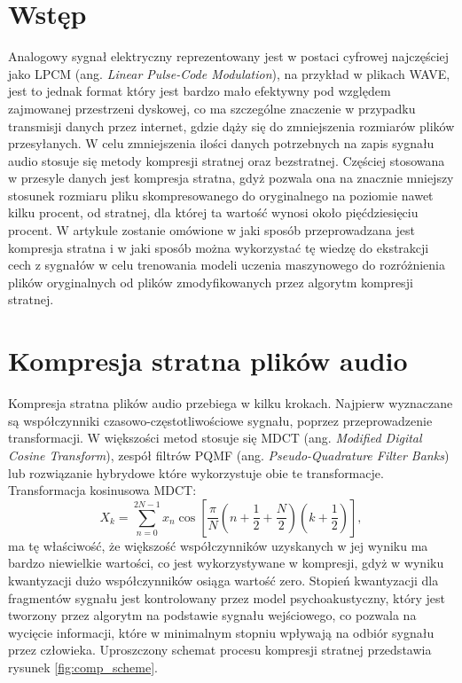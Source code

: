 \documentclass[12pt]{oska}
\affiliation{Akademia Górniczo-Hutnicza w Krakowie}
\let\Oldsection\section
\renewcommand{\section}{\FloatBarrier\Oldsection}
\begin{document}
\maketitles

\section{Wstęp}

Analogowy sygnał elektryczny reprezentowany jest w postaci cyfrowej najczęściej
jako LPCM (ang. \textit{Linear Pulse-Code Modulation}), na przykład w plikach
WAVE, jest to jednak format który jest bardzo mało efektywny pod względem
zajmowanej przestrzeni dyskowej, co ma szczególne znaczenie w przypadku
transmisji danych przez internet, gdzie dąży się do zmniejszenia rozmiarów
plików przesyłanych. W celu zmniejszenia ilości danych potrzebnych na zapis
sygnału audio stosuje się metody kompresji stratnej oraz bezstratnej. Częściej
stosowana w przesyle danych jest kompresja stratna, gdyż pozwala ona na
znacznie mniejszy stosunek rozmiaru pliku skompresowanego do oryginalnego na
poziomie nawet kilku procent, od stratnej, dla której ta wartość wynosi około
pięćdziesięciu procent. W artykule zostanie omówione w jaki sposób
przeprowadzana jest kompresja stratna i w jaki sposób można wykorzystać tę
wiedzę do ekstrakcji cech z sygnałów w celu trenowania modeli uczenia
maszynowego do rozróżnienia plików oryginalnych od plików zmodyfikowanych przez
algorytm kompresji stratnej.

\section{Kompresja stratna plików audio}

Kompresja stratna plików audio przebiega w kilku krokach. Najpierw wyznaczane
są współczynniki czasowo-częstotliwościowe sygnału, poprzez przeprowadzenie
transformacji. W większości metod stosuje się MDCT (ang. \textit{Modified
Digital Cosine Transform}), zespół filtrów PQMF (ang. \textit{Pseudo-Quadrature Filter
Banks}) lub rozwiązanie hybrydowe które wykorzystuje obie te transformacje.
Transformacja kosinusowa MDCT:
\begin{equation}\label{eq:mdct}
  X_k = \sum_{n=0}^{2N-1}x_n\cos\left[\frac{\pi}{N}\left(n+\frac{1}{2}+\frac{N}{2}\right)\left(k+\frac{1}{2}\right)\right],
\end{equation}
ma tę właściwość, że większość współczynników uzyskanych w jej wyniku ma bardzo
niewielkie wartości, co jest wykorzystywane w kompresji, gdyż w wyniku
kwantyzacji dużo współczynników osiąga wartość zero. Stopień kwantyzacji dla
fragmentów sygnału jest kontrolowany przez model psychoakustyczny, który jest
tworzony przez algorytm na podstawie sygnału wejściowego, co pozwala na
wycięcie informacji, które w minimalnym stopniu wpływają na odbiór sygnału
przez człowieka. Uproszczony schemat procesu kompresji stratnej przedstawia
rysunek \ref{fig:comp_scheme}.
\end{document}
